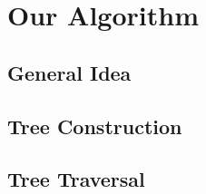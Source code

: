 
\chapter{Our Algorithm}
\label{ch:alg}

\section{General Idea}
\label{sec:alg:idea}

\section{Tree Construction}
\label{sec:alg:con}

\section{Tree Traversal}
\label{sec:alg:tra}